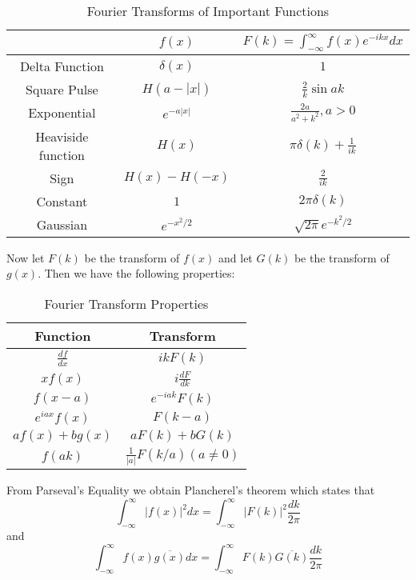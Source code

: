 \begin{table}[H]
    \centering
    \caption{Fourier Transforms of Important Functions}
    \begin{tabular}{ccc}
        \hline
        & $f(x)$ & $F(k) = \int_{-\infty}^{\infty}f(x)e^{-ikx}dx$ \\ \hline
        Delta Function & $\delta(x)$ & $1$ \\
        Square Pulse & $H(a-|x|)$ & $\frac{2}{k}\sin ak$ \\
        Exponential & $e^{-a|x|}$ & $\frac{2a}{a^2+k^2}, a > 0$ \\
        Heaviside function & $H(x)$ & $\pi\delta(k) + \frac{1}{ik}$ \\
        Sign & $H(x) - H(-x)$ & $\frac{2}{ik}$ \\
        Constant & $1$ & $2\pi \delta(k)$ \\
        Gaussian & $e^{-x^2/2}$ & $\sqrt{2\pi}e^{-k^2/2}$ \\ \hline
    \end{tabular}
\end{table}

Now let $F(k)$ be the transform of $f(x)$ and let $G(k)$ be the transform of $g(x)$. Then we have the following properties: 

\begin{table}[H]
    \centering 
    \caption{Fourier Transform Properties}
    \begin{tabular}{cc}
        \hline
        Function & Transform \\ \hline
        $\frac{df}{dx}$ & $ikF(k)$ \\
        $xf(x)$ & $i\frac{dF}{dk}$ \\
        $f(x-a)$ & $e^{-iak}F(k)$ \\
        $e^{iax}f(x)$ & $F(k-a)$ \\
        $af(x)+bg(x)$ & $aF(k)+bG(k)$ \\
        $f(ak)$ & $\frac{1}{|a|}F(k/a) (a \neq 0)$ \\ \hline
    \end{tabular}
\end{table}

From Parseval's Equality we obtain Plancherel's theorem which states that \begin{equation*}
    \int_{-\infty}^{\infty}|f(x)|^2dx = \int_{-\infty}^{\infty}|F(k)|^2\frac{dk}{2\pi}
\end{equation*}
and \begin{equation*}
    \int_{-\infty}^{\infty}f(x)\overline{g(x)}dx = \int_{-\infty}^{\infty}F(k)\overline{G(k)}\frac{dk}{2\pi}
\end{equation*}


